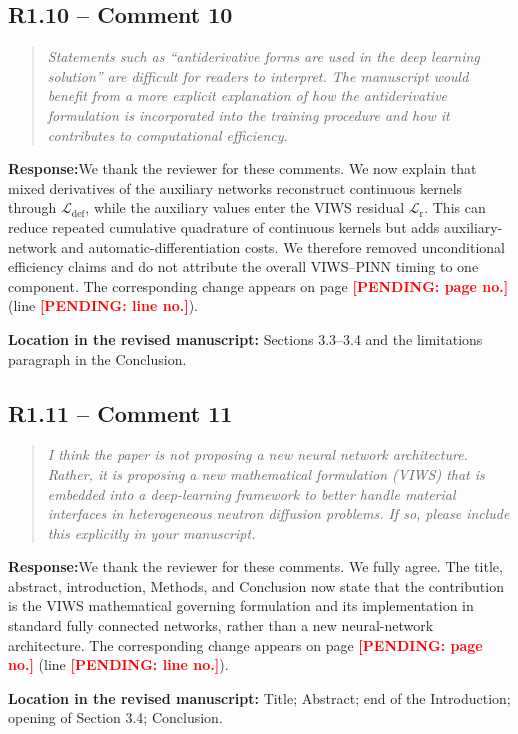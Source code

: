 \documentclass[11pt,a4paper]{article}
\newenvironment{reviewercomment}{\begin{quote}\small\itshape\color{commentgray}}{\end{quote}}
\newcommand{\authorresponse}{\noindent\textbf{Response:}\quad}
\newcommand{\revisionlocation}[1]{\par\noindent\textcolor{locationblue}{\textbf{Location in the revised manuscript: }}#1}
\newcommand{\draftplaceholder}[1]{\textcolor{red}{\textbf{[PENDING: #1]}}}
\begin{document}
\subsection*{R1.10 -- Comment 10}
\begin{reviewercomment}
Statements such as ``antiderivative forms are used in the deep learning solution'' are difficult for readers to interpret. The manuscript would benefit from a more explicit explanation of how the antiderivative formulation is incorporated into the training procedure and how it contributes to computational efficiency.
\end{reviewercomment}
\authorresponse We thank the reviewer for these comments. We now explain that mixed derivatives of the auxiliary networks reconstruct continuous kernels through $\mathcal L_{\mathrm{def}}$, while the auxiliary values enter the VIWS residual $\mathcal L_{\mathrm r}$. This can reduce repeated cumulative quadrature of continuous kernels but adds auxiliary-network and automatic-differentiation costs. We therefore removed unconditional efficiency claims and do not attribute the overall VIWS--PINN timing to one component. The corresponding change appears on page \draftplaceholder{page no.} (line \draftplaceholder{line no.}).
\revisionlocation{Sections 3.3--3.4 and the limitations paragraph in the Conclusion.}

\subsection*{R1.11 -- Comment 11}
\begin{reviewercomment}
I think the paper is not proposing a new neural network architecture. Rather, it is proposing a new mathematical formulation (VIWS) that is embedded into a deep-learning framework to better handle material interfaces in heterogeneous neutron diffusion problems. If so, please include this explicitly in your manuscript.
\end{reviewercomment}
\authorresponse We thank the reviewer for these comments. We fully agree. The title, abstract, introduction, Methods, and Conclusion now state that the contribution is the VIWS mathematical governing formulation and its implementation in standard fully connected networks, rather than a new neural-network architecture. The corresponding change appears on page \draftplaceholder{page no.} (line \draftplaceholder{line no.}).
\revisionlocation{Title; Abstract; end of the Introduction; opening of Section 3.4; Conclusion.}
\end{document}
